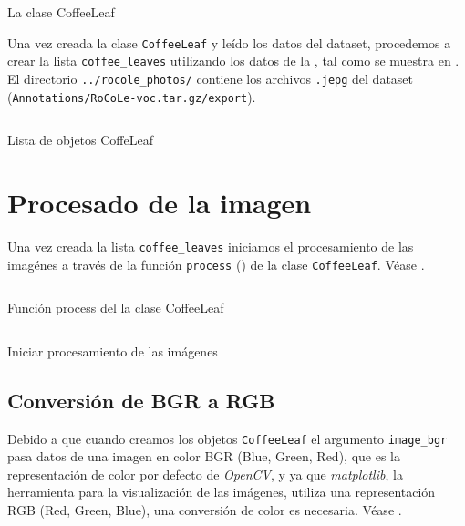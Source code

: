 \begin{listing}[H]
\inputminted{python}{code_listings/coffee_leaf.py}
\caption{La clase CoffeeLeaf}
\label{code:coffee_leaf}
\end{listing}

Una vez creada la clase \texttt{CoffeeLeaf} y leído los datos del dataset, procedemos a crear la lista \texttt{coffee\_leaves} utilizando los datos de la , tal como se muestra en . El directorio \texttt{../rocole\_photos/} contiene los archivos \texttt{.jepg} del dataset (\texttt{Annotations/RoCoLe-voc.tar.gz/export}).

\begin{listing}[H]
\inputminted{python}{code_listings/coffee_leaves.py}
\caption{Lista de objetos CoffeLeaf}
\label{code:coffee_leaves}
\end{listing}

\section{Procesado de la imagen}
Una vez creada la lista \texttt{coffee\_leaves} iniciamos el procesamiento de las imagénes a través de la función \texttt{process} () de la clase \texttt{CoffeeLeaf}. Véase .

\begin{listing}[H]
\inputminted{python}{code_listings/process.py}
\caption{Función process del la clase CoffeeLeaf}
\label{code:process}
\end{listing}

\begin{listing}[H]
\inputminted{python}{code_listings/process_iteration.py}
\caption{Iniciar procesamiento de las imágenes}
\label{code:process_iteration}
\end{listing}

\subsection{Conversión de BGR a RGB}
Debido a que cuando creamos los objetos \texttt{CoffeeLeaf} el argumento \texttt{image\_bgr} pasa datos de una imagen en color \textsf{BGR} (Blue, Green, Red), que es la representación de color por defecto de \textit{OpenCV}, y ya que \textit{matplotlib}, la herramienta para la visualización de las imágenes, utiliza una representación \textsf{RGB} (Red, Green, Blue), una conversión de color es necesaria. Véase .

